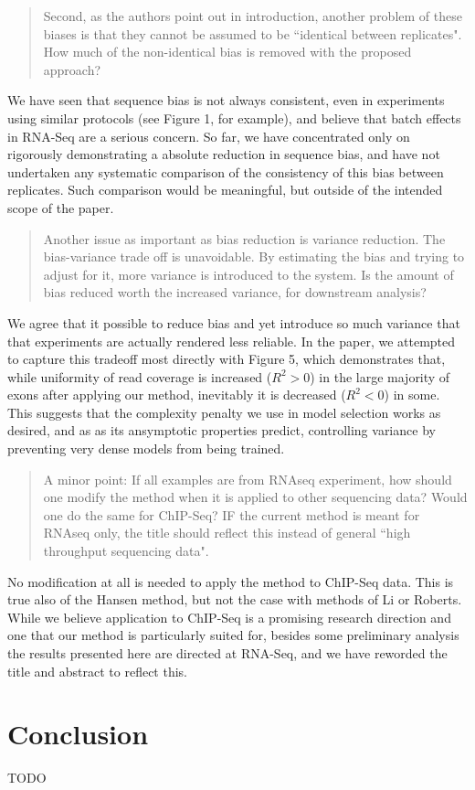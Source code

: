 \documentclass{article}
\begin{document}
\begin{quote}
Second, as the authors point out in introduction, another problem of
these biases is that they cannot be assumed to be ``identical between
replicates". How much of the non-identical bias is removed with the
proposed approach?
\end{quote}

We have seen that sequence bias is not always consistent, even in experiments
using similar protocols (see Figure 1, for example), and believe that batch
effects in RNA-Seq are a serious concern. So far, we have concentrated only on
rigorously demonstrating a absolute reduction in sequence bias, and have not
undertaken any systematic comparison of the consistency of this bias between
replicates. Such comparison would be meaningful, but outside of the intended
scope of the paper.


\begin{quote}
Another issue as important as bias reduction is variance reduction. The
bias-variance trade off is unavoidable. By estimating the bias and trying to
adjust for it, more variance is introduced to the system. Is the amount of bias
reduced worth the increased variance, for downstream analysis?
\end{quote}

We agree that it possible to reduce bias and yet introduce so much variance that
that experiments are actually rendered less reliable. In the paper, we attempted
to capture this tradeoff most directly with Figure 5, which demonstrates that,
while uniformity of read coverage is increased ($R^2 > 0$) in the large majority
of exons after applying our method, inevitably it is decreased ($R^2 < 0$) in
some. This suggests that the complexity penalty we use in model selection works
as desired, and as as its ansymptotic properties predict, controlling variance by
preventing very dense models from being trained.


\begin{quote}
A minor point: If all examples are from RNAseq experiment, how should
one modify the method when it is applied to other sequencing data?
Would one do the same for ChIP-Seq? IF the current method is meant for
RNAseq only, the title should reflect this instead of general ``high
throughput sequencing data".
\end{quote}

No modification at all is needed to apply the method to ChIP-Seq data. This is
true also of the Hansen method, but not the case with methods of Li or Roberts.
While we believe application to ChIP-Seq is a promising research direction and
one that our method is particularly suited for, besides some preliminary
analysis the results presented here are directed at RNA-Seq, and we have
reworded the title and abstract to reflect this.


\section*{Conclusion}

TODO
\end{document}
